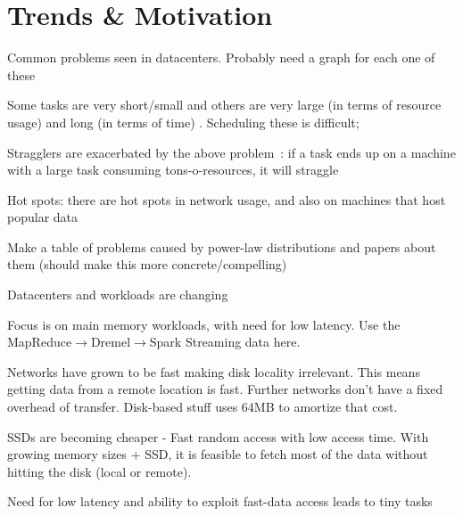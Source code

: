 \section{Trends \& Motivation}

Common problems seen in datacenters. Probably need a graph for each one of these
\begin{myitemize}
  \item  Some tasks are very short/small and others are very large (in terms of
    resource usage) and long (in terms of time) .  
    Scheduling these is difficult; 

  \item Stragglers are exacerbated by the above problem~: if a task
    ends up on a machine with a large task consuming tons-o-resources, it will
    straggle

  \item Hot spots: there are hot spots in network usage, and also on machines
    that host popular data
\end{myitemize}

Make a table of problems caused by power-law distributions and papers about
them (should make this more concrete/compelling)

Datacenters and workloads are changing
\begin{myitemize}
  \item Focus is on main memory workloads, with need for low latency. Use the
    MapReduce$\rightarrow$Dremel$\rightarrow$Spark Streaming data here.
  \item Networks have grown to be fast making disk locality irrelevant. This
    means getting data from a remote location is fast. Further networks don't
    have a fixed overhead of transfer. Disk-based stuff uses 64MB to amortize
    that cost. 
  \item SSDs are becoming cheaper - Fast random access with low access time.
    With growing memory sizes + SSD, it is feasible to fetch most of the data
    without hitting the disk (local or remote).
  \item Need for low latency and ability to exploit fast-data access leads to
    tiny tasks
\end{myitemize}
